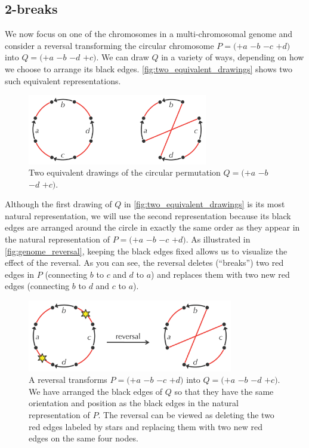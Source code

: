 \vspace{-0.5\baselineskip}

\subsection{2-breaks}
\label{subsec:two-breaks}

We now focus on one of the chromosomes in a multi-chromosomal genome and consider a reversal transforming the circular chromosome $P=(+a$ $-b$ $-c$ $+d)$ into $Q=(+a$ $-b$ $-d$ $+c)$. We can draw $Q$ in a variety of ways, depending on how we choose to arrange its black edges. \autoref{fig:two_equivalent_drawings} shows two such equivalent representations.

\begin{figure}[h]
\mySfFamily
\centering
\includegraphics[width = 0.7\textwidth]{images/rearrangements/two_equivalent_drawings}
\caption{Two equivalent drawings of the circular permutation $Q=(+a$ $-b$ $-d$ $+c)$.}
\label{fig:two_equivalent_drawings}
\end{figure}

Although the first drawing of $Q$ in \autoref{fig:two_equivalent_drawings} is its most natural representation, we will use the second representation because its black edges are arranged around the circle in exactly the same order as they appear in the natural representation of $P=(+a$ $-b$ $-c$ $+d)$.  As illustrated in \autoref{fig:genome_reversal}, keeping the black edges fixed allows us to visualize the effect of the reversal.  As you can see, the reversal deletes (``breaks'') two red edges in $P$ (connecting $b$ to $c$ and $d$ to $a$) and replaces them with two new red edges (connecting $b$ to $d$ and $c$ to $a$).\\

\begin{figure}[h]
\mySfFamily
\centering
\includegraphics[width = 0.8\textwidth]{images/rearrangements/genome_reversal}
\caption{A reversal transforms $P=(+a$ $-b$ $-c$ $+d)$ into $Q=(+a$ $-b$ $-d$ $+c)$.  We have arranged the black edges of $Q$ so that they have the same orientation and position as the black edges in the natural representation of $P$.  The reversal can be viewed as deleting the two red edges labeled by stars and replacing them with two new red edges on the same four nodes.}
\label{fig:genome_reversal}
\end{figure}

